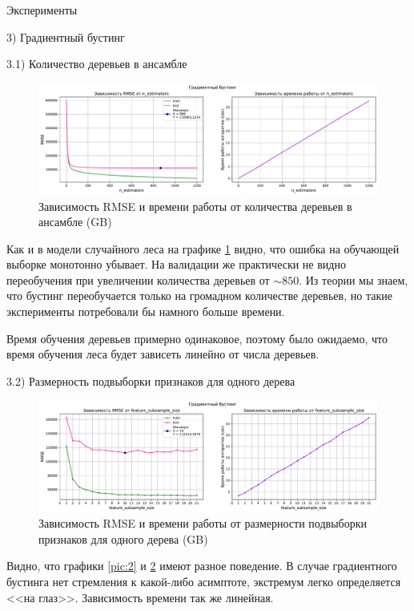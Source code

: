 \documentclass[a4paper,12pt,titlepage,finall]{article}
\begin{document}
\begin{section}{Эксперименты}
\begin{subsection}{3) Градиентный бустинг}
\begin{subsubsection}{3.1) Количество деревьев в ансамбле}
\begin{figure}[H]
	\includegraphics[scale=0.9, width=17cm]{G_1.pdf}
	\centering
	\caption{Зависимость RMSE и времени работы от количества деревьев в ансамбле (GB)}
	\label{pic:4}
\end{figure}
Как и в модели случайного леса на графике \ref{pic:4} видно, что ошибка на обучающей выборке монотонно убывает. На валидации же практически не видно переобучения при увеличении количества деревьев от $\sim850$. Из теории мы знаем, что бустинг переобучается только на громадном количестве деревьев, но такие эксперименты потребовали бы намного больше времени.\par Время обучения деревьев примерно одинаковое, поэтому было ожидаемо, что время обучения леса будет зависеть линейно от числа деревьев.

\end{subsubsection}

\begin{subsubsection}{3.2) Размерность подвыборки признаков для одного дерева}
\begin{figure}[H]
	\includegraphics[scale=0.9, width=17cm]{G_2.pdf}
	\centering
	\caption{Зависимость RMSE и времени работы от размерности подвыборки признаков для одного дерева (GB)}
	\label{pic:5}
\end{figure}
Видно, что графики \ref{pic:2} и \ref{pic:5} имеют разное поведение. В случае градиентного бустинга нет стремления к какой-либо асимптоте, экстремум легко определяется <<на глаз>>. Зависимость времени так же линейная.
\end{subsubsection}


\end{subsection}
\end{section}
\end{document}
